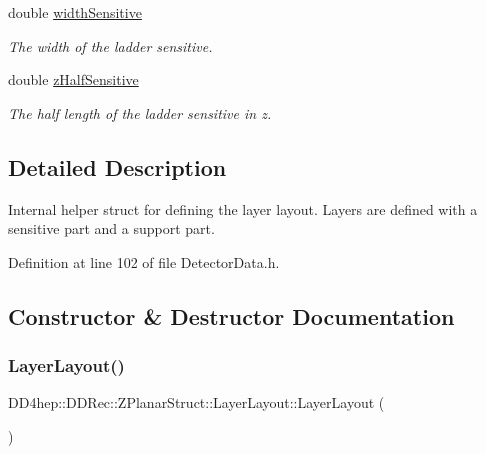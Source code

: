 \begin{DoxyCompactItemize}
double \hyperlink{struct_d_d4hep_1_1_d_d_rec_1_1_z_planar_struct_1_1_layer_layout_ab19bdf088e4b8dc7549454825c9592c8}{width\+Sensitive}
\begin{DoxyCompactList}\small\item\em The width of the ladder sensitive. \end{DoxyCompactList}\item 
double \hyperlink{struct_d_d4hep_1_1_d_d_rec_1_1_z_planar_struct_1_1_layer_layout_ae8c448242045e1e213990a74150b5df7}{z\+Half\+Sensitive}
\begin{DoxyCompactList}\small\item\em The half length of the ladder sensitive in z. \end{DoxyCompactList}\end{DoxyCompactItemize}


\subsection{Detailed Description}
Internal helper struct for defining the layer layout. Layers are defined with a sensitive part and a support part. 

Definition at line 102 of file Detector\+Data.\+h.



\subsection{Constructor \& Destructor Documentation}
\hypertarget{struct_d_d4hep_1_1_d_d_rec_1_1_z_planar_struct_1_1_layer_layout_ab128733c50738ce7dd0c00c44e16e57c}{}\label{struct_d_d4hep_1_1_d_d_rec_1_1_z_planar_struct_1_1_layer_layout_ab128733c50738ce7dd0c00c44e16e57c} 
\subsubsection{\texorpdfstring{Layer\+Layout()}{LayerLayout()}}
{\footnotesize\ttfamily D\+D4hep\+::\+D\+D\+Rec\+::\+Z\+Planar\+Struct\+::\+Layer\+Layout\+::\+Layer\+Layout (\begin{DoxyParamCaption}{ }\end{DoxyParamCaption})\hspace{0.3cm}{\ttfamily [inline]}}



